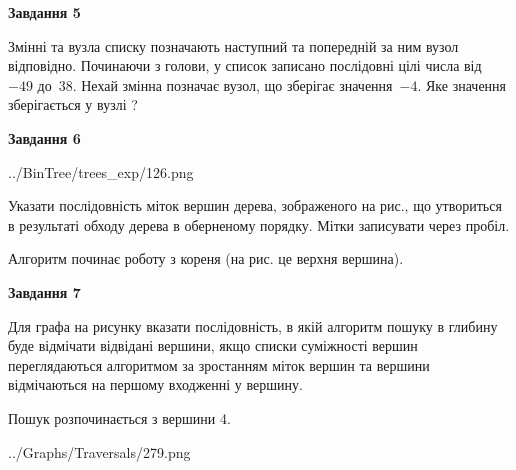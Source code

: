 \documentclass[12pt, ukrainian]{article}
\begin{document}
{\begin {large}
{\begin {center}\textbf{Завдання 5}\end {center}}\par
Змінні  та  вузла списку позначають наступний та попередній за ним вузол відповідно. Починаючи з голови, у список записано послідовні цілі числа від~$-49$ до~$38$. Нехай змінна  позначає вузол, що зберігає значення~$-4$.
Яке значення зберігається у вузлі  ?\par
\newpage

{\begin {center}\textbf{Завдання 6}\end {center}}\par

\begin{center}
	{../BinTree/trees_exp/126.png}
\end{center}
Указати послідовність міток вершин дерева, зображеного на рис., що утвориться в результаті обходу дерева в оберненому порядку. Мітки записувати через пробіл.\par Алгоритм починає роботу з кореня (на рис. це верхня вершина).\par
\newpage

{\begin {center}\textbf{Завдання 7}\end {center}}\par
Для графа на рисунку вказати послідовність, в якій алгоритм пошуку в глибину буде відмічати відвідані вершини, якщо списки суміжності вершин переглядаються алгоритмом за зростанням міток вершин та вершини відмічаються на першому вход\-женні у вершину.\par
Пошук розпочинається з вершини 4.\par

\begin{center}
	{../Graphs/Traversals/279.png}
\end{center}\par
\newpage


\end{large}}
\end{document}
